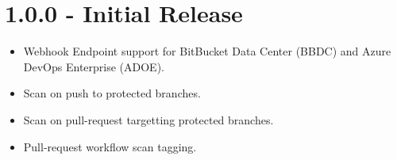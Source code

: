 \section{1.0.0 - Initial Release}
    \begin{itemize}
        \item Webhook Endpoint support for BitBucket Data Center (BBDC) and Azure DevOps Enterprise (ADOE).
        \item Scan on push to protected branches.
        \item Scan on pull-request targetting protected branches.
        \item Pull-request workflow scan tagging.
    \end{itemize}